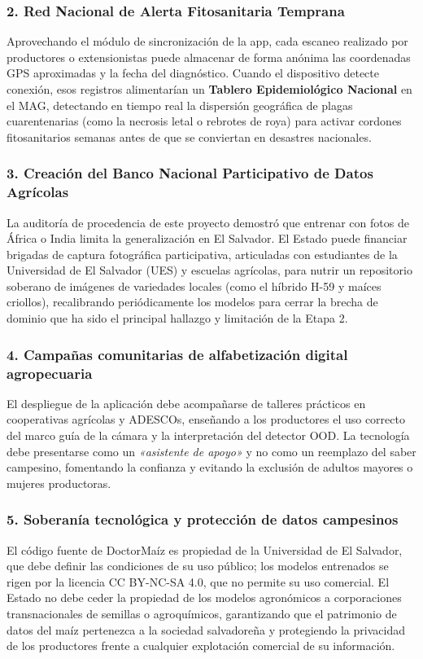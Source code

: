 \documentclass[12pt,letterpaper]{article}
\begin{document}
\subsubsection{2. Red Nacional de Alerta Fitosanitaria Temprana}
Aprovechando el m\'odulo de sincronizaci\'on de la app, cada escaneo realizado por productores o extensionistas puede almacenar de forma an\'onima las coordenadas GPS aproximadas y la fecha del diagn\'ostico. Cuando el dispositivo detecte conexi\'on, esos registros alimentar\'ian un \textbf{Tablero Epidemiol\'ogico Nacional} en el MAG, detectando en tiempo real la dispersi\'on geogr\'afica de plagas cuarentenarias (como la necrosis letal o rebrotes de roya) para activar cordones fitosanitarios semanas antes de que se conviertan en desastres nacionales.

\subsubsection{3. Creaci\'on del Banco Nacional Participativo de Datos Agr\'icolas}
La auditor\'ia de procedencia de este proyecto demostr\'o que entrenar con fotos de \'Africa o India limita la generalizaci\'on en El Salvador. El Estado puede financiar brigadas de captura fotogr\'afica participativa, articuladas con estudiantes de la Universidad de El Salvador (UES) y escuelas agr\'icolas, para nutrir un repositorio soberano de im\'agenes de variedades locales (como el h\'ibrido H-59 y ma\'ices criollos), recalibrando peri\'odicamente los modelos para cerrar la brecha de dominio que ha sido el principal hallazgo y limitaci\'on de la Etapa 2.

\subsubsection{4. Campa\~nas comunitarias de alfabetizaci\'on digital agropecuaria}
El despliegue de la aplicaci\'on debe acompa\~narse de talleres pr\'acticos en cooperativas agr\'icolas y ADESCOs, ense\~nando a los productores el uso correcto del marco gu\'ia de la c\'amara y la interpretaci\'on del detector OOD. La tecnolog\'ia debe presentarse como un \textit{«asistente de apoyo»} y no como un reemplazo del saber campesino, fomentando la confianza y evitando la exclusi\'on de adultos mayores o mujeres productoras.

\subsubsection{5. Soberan\'ia tecnol\'ogica y protecci\'on de datos campesinos}
El c\'odigo fuente de DoctorMa\'iz es propiedad de la Universidad de El Salvador, que debe definir las condiciones de su uso p\'ublico; los modelos entrenados se rigen por la licencia CC BY-NC-SA 4.0, que no permite su uso comercial. El Estado no debe ceder la propiedad de los modelos agron\'omicos a corporaciones transnacionales de semillas o agroqu\'imicos, garantizando que el patrimonio de datos del ma\'iz pertenezca a la sociedad salvadore\~na y protegiendo la privacidad de los productores frente a cualquier explotaci\'on comercial de su informaci\'on.
\end{document}
